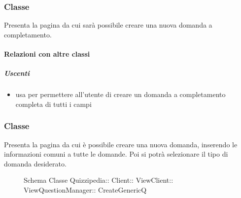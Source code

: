 \subsubsection{Classe }
Presenta la pagina da cui sarà possibile creare una nuova domanda a completamento.
\paragraph{Relazioni con altre classi}
\subparagraph{Uscenti}
\begin{itemize}
\item usa  per permettere all'utente di creare un domanda a completamento completa di tutti i campi
\end{itemize}
\subsubsection{Classe }
Presenta la pagina da cui è possibile creare una nuova domanda, inserendo le informazioni comuni a tutte le domande. Poi si potrà selezionare il tipo di domanda desiderato.
\begin{figure}[H]
\centering
\noindent{}
\caption[Schema Classe CreateGenericQ]{Schema Classe Quizzipedia:: Client:: ViewClient:: ViewQuestionManager:: CreateGenericQ}
\end{figure}
